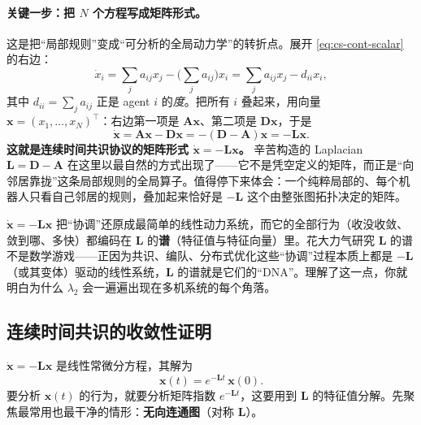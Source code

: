 \paragraph{关键一步：把 $N$ 个方程写成矩阵形式。}
这是把“局部规则”变成“可分析的全局动力学”的转折点。展开 \cref{eq:cs-cont-scalar} 的右边：
\begin{equation}
  \dot x_i = \sum_{j} a_{ij}x_j - \Big(\sum_{j}a_{ij}\Big)x_i = \sum_j a_{ij}x_j - d_{ii}x_i,
  \label{eq:cs-expand}
\end{equation}
其中 $d_{ii}=\sum_j a_{ij}$ 正是 agent $i$ 的\emph{度}。把所有 $i$ 叠起来，用向量 $\mathbf{x}=(x_1,\dots,x_N)^\top$：右边第一项是 $\mathbf{A}\mathbf{x}$、第二项是 $\mathbf{D}\mathbf{x}$，于是
\begin{equation}
  \dot{\mathbf{x}} = \mathbf{A}\mathbf{x} - \mathbf{D}\mathbf{x} = -(\mathbf{D}-\mathbf{A})\mathbf{x} = -\mathbf{L}\mathbf{x}.
  \label{eq:cs-cont-matrix}
\end{equation}
\textbf{这就是连续时间共识协议的矩阵形式 $\dot{\mathbf{x}}=-\mathbf{L}\mathbf{x}$。} 辛苦构造的 Laplacian $\mathbf{L}=\mathbf{D}-\mathbf{A}$ 在这里以最自然的方式出现了——它不是凭空定义的矩阵，而正是“向邻居靠拢”这条局部规则的全局算子\cite{olfatisaber2004consensus}。值得停下来体会：一个纯粹局部的、每个机器人只看自己邻居的规则，叠加起来恰好是 $-\mathbf{L}$ 这个由整张图拓扑决定的矩阵。

\begin{insight}\label{ins:cs-spectrum}
$\dot{\mathbf{x}}=-\mathbf{L}\mathbf{x}$ 把“协调”还原成最简单的线性动力系统，而它的全部行为（收没收敛、敛到哪、多快）都编码在 $\mathbf{L}$ 的\textbf{谱}（特征值与特征向量）里。花大力气研究 $\mathbf{L}$ 的谱不是数学游戏——正因为共识、编队、分布式优化这些“协调”过程本质上都是 $-\mathbf{L}$（或其变体）驱动的线性系统，$\mathbf{L}$ 的谱就是它们的“DNA”。理解了这一点，你就明白为什么 $\lambda_2$ 会一遍遍出现在多机系统的每个角落。
\end{insight}

\subsection{连续时间共识的收敛性证明}
\label{sec:cs-cont-proof}

$\dot{\mathbf{x}}=-\mathbf{L}\mathbf{x}$ 是线性常微分方程，其解为
\begin{equation}
  \mathbf{x}(t) = e^{-\mathbf{L}t}\,\mathbf{x}(0).
  \label{eq:cs-matexp}
\end{equation}
要分析 $\mathbf{x}(t)$ 的行为，就要分析矩阵指数 $e^{-\mathbf{L}t}$，这要用到 $\mathbf{L}$ 的特征值分解。先聚焦最常用也最干净的情形：\textbf{无向连通图}（对称 $\mathbf{L}$）。

